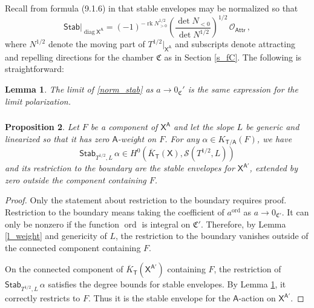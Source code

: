 \documentclass[14pt]{extarticle}
\newcommand{\bT}{\mathsf{T}}
\newcommand{\bA}{\mathsf{A}}
\newcommand{\bX}{\mathsf{X}}
\newcommand{\fC}{\mathfrak{C}}
\newcommand{\cS}{\mathscr{S}}
\newcommand{\cO}{\mathscr{O}}
\newcommand{\Stab}{\mathsf{Stab}}
\newcommand{\Attr}{\mathsf{Attr}}
\DeclareMathOperator{\rk}{rk}
\DeclareMathOperator{\diag}{diag}
\DeclareMathOperator{\ord}{ord}
\newtheorem{Lemma}{Lemma}[section]
\newtheorem{Proposition}[Lemma]{Proposition}
\theoremstyle{definition}
\newcommand{\Kbar}{\overline{K}}
\begin{document}
\noindent 
Recall from
formula (9.1.6) in \cite{Opcmi} that stable envelopes may be
normalized so that
%
\begin{equation}
  \label{norm_stab}
  \Stab\big|_{\diag \bX^\bA} = (-1)^{-\rk N^{1/2}_{>0}} \left(\frac{\det
      N_{<0}} {\det N^{1/2}} \right)^{1/2} \, \cO_\Attr \,,
\end{equation}
%
where $N^{1/2}$ denote the moving part of $ T^{1/2}\big|_{\bX^{\bA}}$ and
subscripts denote attracting and repelling directions for
the chamber $\fC$ as in Section \ref{s_fC}. The following is
straightforward: 

\begin{Lemma}\label{l_res_Attr}
The limit of \eqref{norm_stab} as $a\to 0_\fC'$ is the same expression for
the limit polarization. 
\end{Lemma}



\subsubsection{}



\begin{Proposition}\label{p_stable_compact}
Let $F$ be a component of $\bX^\bA$ and let the slope $L$ be generic
and linearized so that
it has zero $\bA$-weight on $F$. For any $\alpha \in K_{\bT/\bA}(F)$,
we have
%
\begin{equation}
\Stab_{T^{1/2},L} \, \alpha \in H^0\left(\Kbar_\bT(\bX), \cS(T^{1/2},L)\right)\label{StabH0}
\end{equation}
%
and its restriction to the boundary are the stable envelopes for
$\bX^{\bA'}$, extended by zero outside the component containing $F$. 
\end{Proposition}


\begin{proof}
Only the statement about restriction to the boundary requires
proof. Restriction to the boundary means taking the coefficient of 
$a^{\ord}$ as $a\to 0_{\fC'}$. It can only be nonzero if the function
$\ord$ is integral on $\fC'$. Therefore, by Lemma \ref{l_weight} and
genericity of $L$, 
the restriction to the boundary vanishes outside of the connected
component containing $F$.

On the connected component of $\Kbar_\bT(\bX^{\bA'})$ containing $F$,
the restriction of $\Stab_{T^{1/2},L} \, \alpha$ 
satisfies the degree bounds for stable envelopes.  By Lemma
\ref{l_res_Attr}, it correctly restricts to $F$. Thus it is the stable
envelope for the $\bA$-action on $\bX^{\bA'}$. 
\end{proof}
\end{document}
